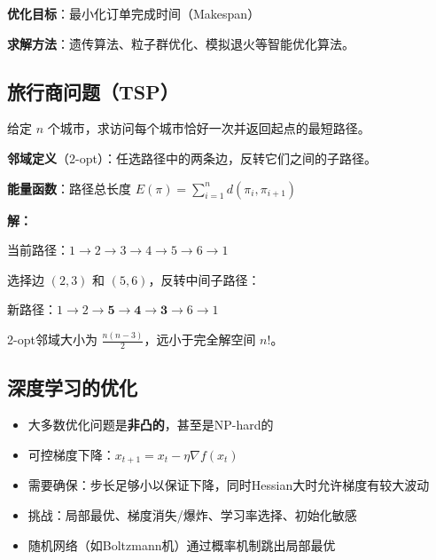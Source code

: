 \textbf{优化目标}：最小化订单完成时间（Makespan）

\textbf{求解方法}：遗传算法、粒子群优化、模拟退火等智能优化算法。

\subsection{旅行商问题（TSP）}

\begin{conceptbox}[TSP的SA求解]
给定 $n$ 个城市，求访问每个城市恰好一次并返回起点的最短路径。

\textbf{邻域定义}（2-opt）：任选路径中的两条边，反转它们之间的子路径。

\textbf{能量函数}：路径总长度 $E(\pi) = \sum_{i=1}^{n} d(\pi_i, \pi_{i+1})$
\end{conceptbox}

\begin{example}
\textbf{解：}

当前路径：$1 \to 2 \to 3 \to 4 \to 5 \to 6 \to 1$

选择边 $(2,3)$ 和 $(5,6)$，反转中间子路径：

新路径：$1 \to 2 \to \textbf{5} \to \textbf{4} \to \textbf{3} \to 6 \to 1$

2-opt邻域大小为 $\frac{n(n-3)}{2}$，远小于完全解空间 $n!$。
\end{example}

\subsection{深度学习的优化}

\begin{notebox}[深度学习中的优化特点]
\begin{itemize}[itemsep=0.3em]
    \item 大多数优化问题是\textbf{非凸的}，甚至是NP-hard的
    \item 可控梯度下降：$x_{t+1} = x_t - \eta \nabla f(x_t)$
    \item 需要确保：步长足够小以保证下降，同时Hessian大时允许梯度有较大波动
    \item 挑战：局部最优、梯度消失/爆炸、学习率选择、初始化敏感
    \item 随机网络（如Boltzmann机）通过概率机制跳出局部最优
\end{itemize}
\end{notebox}

